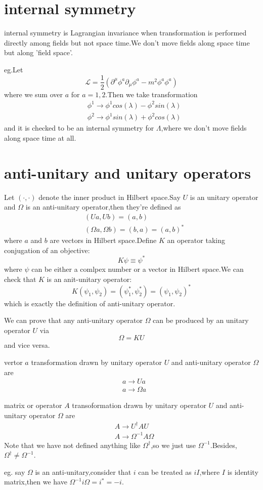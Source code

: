 \documentclass[a4paper]{article}
\begin{document}
\section{internal symmetry}
internal symmetry is Lagrangian invariance when transformation is performed directly among fields but not space time.We don't move fields along space time but along 'field space'.
\par eg.Let $$\mathscr{L}=\frac{1}{2}(\partial^{\mu}\phi^a\partial_{\mu}\phi^a-m^2\phi^a\phi^a)$$where we sum over $a$ for $a=1,2$.Then we take transformation
\begin{align*}
	&\phi^1\rightarrow\phi^1cos(\lambda)-\phi^2sin(\lambda)\\
	&\phi^2\rightarrow\phi^1sin(\lambda)+\phi^2cos(\lambda)
\end{align*}
and it is checked to be an internal symmetry for $\mathscr{\Lambda}$,where we don't move fields along space time at all.
\section{anti-unitary and unitary operators}
Let $(\cdot,\cdot)$ denote the inner product in Hilbert space.Say $U$ is an unitary operator and $\Omega$ is an anti-unitary operator,then they're defined as
\begin{align*}
	&(Ua,Ub)=(a,b)\\
	&(\Omega a,\Omega b)=(b,a)=(a,b)^*
\end{align*}
where $a$ and $b$ are vectors in Hilbert space.Define $K$ an operator taking conjugation of an objective:$$K\psi\equiv\psi^*$$where $\psi$ can be either a comlpex number or a vector in Hilbert space.We can check that $K$ is an anit-unitary operator:$$K(\psi_1,\psi_2)=(\psi_1^*,\psi_2^*)=(\psi_1,\psi_2)^*$$which is exactly the definition of anti-unitary operator.
\par We can prove that any anti-unitary operator $\Omega$ can be produced by an unitary operator $U$ via$$\Omega=KU$$and vice versa.
\par vertor $a$ transformation drawn by unitary operator $U$ and anti-unitary operator $\Omega$ are
\begin{align*}
	&a\rightarrow Ua\\
	&a\rightarrow \Omega a
\end{align*}
\par  matrix or operator $A$ transoformation drawn by unitary operator $U$ and anti-unitary operator $\Omega$ are
\begin{align*}
	&A\rightarrow U^{\dagger}AU\\
	&A\rightarrow \Omega^{-1}A\Omega
\end{align*}
Note that we have not defined anything like $\Omega^{\dagger}$,so we just use $\Omega^{-1}$.Besides,$\Omega^{\dagger}\ne\Omega^{-1}$.
\par eg. say $\Omega$ is an anti-unitary,consider that $i$ can be treated as $iI$,where $I$ is identity matrix,then we have $\Omega^{-1} i\Omega=i^*=-i$.
\end{document}

